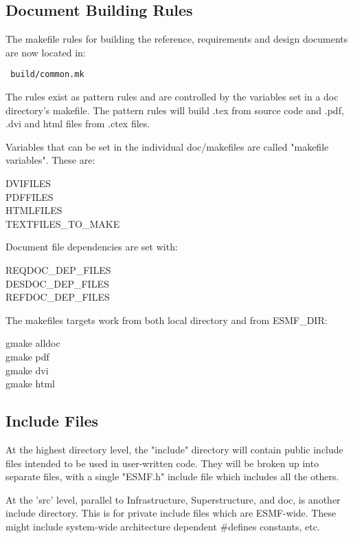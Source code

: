 \subsection{Document Building Rules} 
The makefile rules for building the
reference, requirements and design documents are now located in:
\begin{verbatim} build/common.mk \end{verbatim} 
The rules exist
as pattern rules and are controlled by the variables set in a doc
directory's makefile.  The pattern rules will build .tex  from source code
and .pdf, .dvi and html files from .ctex files.

Variables that can be set in the individual doc/makefiles are called
"makefile variables".  These are: 
\begin{description} 
\item [DVIFILES]
\item [PDFFILES] 
\item [HTMLFILES] 
\item [TEXTFILES\_TO\_MAKE]
\end{description}

Document file dependencies are set with: 
\begin{description} 
\item [REQDOC\_DEP\_FILES] 
\item [DESDOC\_DEP\_FILES] 
\item [REFDOC\_DEP\_FILES]
\end{description}

The makefiles targets work from both local directory and from ESMF\_DIR:
\begin{description} 
\item [gmake alldoc] 
\item [gmake pdf] 
\item [gmake dvi] 
\item [gmake html] 
\end{description}


\subsection{Include Files} 
At the highest directory level, the "include"
directory will contain public include files intended to be used in
user-written code.  They will be broken up into separate files, with a
single "ESMF.h" include file which includes all the others.

At the 'src' level, parallel to Infrastructure, Superstructure, and doc,
is another include directory.  This is for private include files which are
ESMF-wide.  These might include system-wide architecture dependent
\#defines constants, etc.

